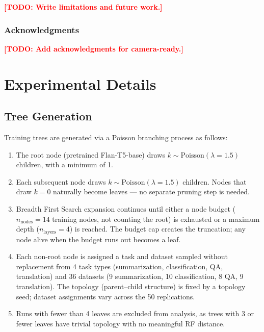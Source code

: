 \documentclass{article}
\newcommand{\TODO}[1]{\textcolor{red}{\textbf{[TODO: #1]}}}
\begin{document}
\TODO{Write limitations and future work.}


\subsubsection*{Acknowledgments}
\TODO{Add acknowledgments for camera-ready.}





\appendix

\section{Experimental Details}
\label{app:details}

\subsection*{Tree Generation}
\label{app:tree-gen}

Training trees are generated via a Poisson branching process as follows:

\begin{enumerate}
    \item The root node (pretrained Flan-T5-base) draws $k \sim \mathrm{Poisson}(\lambda = 1.5)$ children, with a minimum of 1.
    \item Each subsequent node draws $k \sim \mathrm{Poisson}(\lambda = 1.5)$ children. Nodes that draw $k = 0$ naturally become leaves --- no separate pruning step is needed.
    \item Breadth First Search expansion continues until either a node budget ($n_\mathrm{nodes} = 14$ training nodes, not counting the root) is exhausted or a maximum depth ($n_\mathrm{layers} = 4$) is reached. The budget cap creates the truncation; any node alive when the budget runs out becomes a leaf.
    \item Each non-root node is assigned a task and dataset sampled without replacement from 4 task types (summarization, classification, QA, translation) and 36 datasets (9 summarization, 10 classification, 8 QA, 9 translation). The topology (parent--child structure) is fixed by a topology seed; dataset assignments vary across the 50 replications.
    \item Runs with fewer than 4 leaves are excluded from analysis, as trees with 3 or fewer leaves have trivial topology with no meaningful RF distance.
\end{enumerate}
\end{document}
